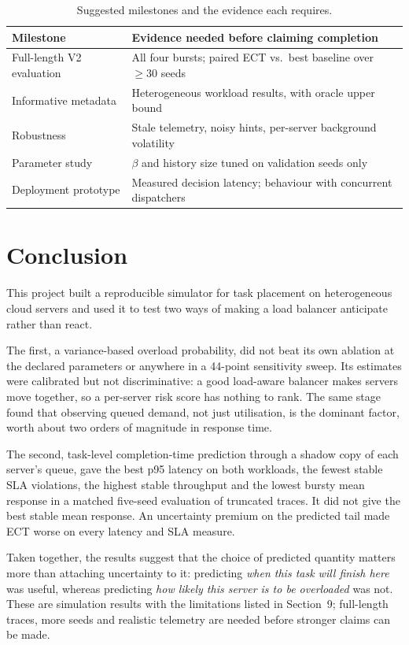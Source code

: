 \documentclass[11pt,a4paper]{article}
\begin{document}
\begin{table}[H]
\caption{Suggested milestones and the evidence each requires.}\label{tab:milestones}
\begin{tabularx}{\linewidth}{lY}
\toprule
\textbf{Milestone} & \textbf{Evidence needed before claiming completion}\\
\midrule
Full-length V2 evaluation & All four bursts; paired ECT vs.\ best baseline over $\ge 30$ seeds\\
Informative metadata & Heterogeneous workload results, with oracle upper bound\\
Robustness & Stale telemetry, noisy hints, per-server background volatility\\
Parameter study & $\beta$ and history size tuned on validation seeds only\\
Deployment prototype & Measured decision latency; behaviour with concurrent dispatchers\\
\bottomrule
\end{tabularx}
\end{table}

\section{Conclusion}
This project built a reproducible simulator for task placement on heterogeneous cloud servers and used it to
test two ways of making a load balancer anticipate rather than react.

The first, a variance-based overload probability, did not beat its own ablation at the declared parameters or
anywhere in a 44-point sensitivity sweep. Its estimates were calibrated but not discriminative: a good
load-aware balancer makes servers move together, so a per-server risk score has nothing to rank. The same
stage found that observing queued demand, not just utilisation, is the dominant factor, worth about two orders
of magnitude in response time.

The second, task-level completion-time prediction through a shadow copy of each server's queue, gave the best
p95 latency on both workloads, the fewest stable SLA violations, the highest stable throughput and the lowest
bursty mean response in a matched five-seed evaluation of truncated traces. It did not give the best stable mean
response. An uncertainty premium on the predicted tail made ECT worse on every latency and SLA measure.

Taken together, the results suggest that the choice of predicted quantity matters more than attaching
uncertainty to it: predicting \emph{when this task will finish here} was useful, whereas predicting
\emph{how likely this server is to be overloaded} was not. These are simulation results with the limitations
listed in Section~9; full-length traces, more seeds and realistic telemetry are needed before stronger claims
can be made.
\end{document}
